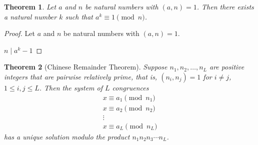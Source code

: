 \documentclass[12pt,leqno]{article}
\numberwithin{equation}{section}
\newtheorem{thm}{Theorem}[section]
\theoremstyle{definition}
\begin{document}

\begin{thm}
Let $a$ and $n$ be natural numbers with $(a, n) = 1$.  Then there
exists a natural number $k$ such that $a^k \equiv 1 \pmod{n}$.
\end{thm}
\begin{proof}[Proof]
Let $a$ and $n$ be natural numbers with $(a, n) = 1$.

$n \mid a^k - 1$

\end{proof}

\pagebreak
\setcounter{section}{3}
\setcounter{thm}{28}

\begin{thm}[Chinese Remainder Theorem]
Suppose $n_1, n_2, \hdots, n_L$ are positive integers that are
pairwise relatively prime, that is, $(n_i, n_j)=1$ for $i\neq j$,
$1\leq i, j \leq L$.  Then the system of $L$ congruences
\[ \begin{array}{c}
x \equiv a_1 \pmod{n_1} \\
x \equiv a_2 \pmod{n_2} \\
\vdots \\
x \equiv a_L \pmod{n_L} \end{array} \] has a unique solution modulo
the product $n_1 n_2  n_3 \cdots n_L$.
\end{thm}
\end{document}
